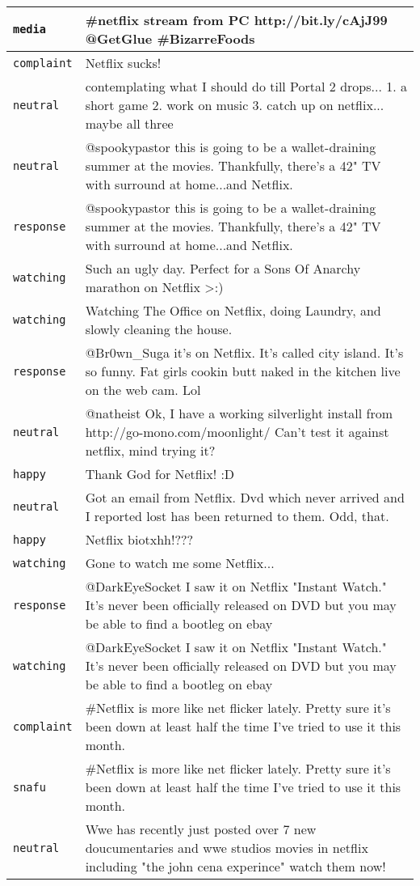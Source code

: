 \begin{center}
\begin{longtable}{|l|p{120mm}|}
         \texttt{media} & \#netflix stream from PC http://bit.ly/cAjJ99 @GetGlue \#BizarreFoods
      \tabularnewline\hline
         \texttt{complaint} & Netflix sucks!
      \tabularnewline\hline
         \texttt{neutral} & contemplating what I should do till Portal 2 drops... 1. a short game 2. work on music 3. catch up on netflix... maybe all three
      \tabularnewline\hline
         \texttt{neutral} & @spookypastor this is going to be a wallet-draining summer at the movies. Thankfully, there's a 42" TV with surround at home...and Netflix.
      \tabularnewline\hline
         \texttt{response} & @spookypastor this is going to be a wallet-draining summer at the movies. Thankfully, there's a 42" TV with surround at home...and Netflix.
      \tabularnewline\hline
         \texttt{watching} & Such an ugly day. Perfect for a Sons Of Anarchy marathon on Netflix >:)
      \tabularnewline\hline
         \texttt{watching} & Watching The Office on Netflix, doing Laundry, and slowly cleaning the house.
      \tabularnewline\hline
         \texttt{response} & @Br0wn\_Suga it's on Netflix. It's called city island. It's so funny. Fat girls cookin butt naked in the kitchen live on the web cam. Lol
      \tabularnewline\hline
         \texttt{neutral} & @natheist Ok, I have a working silverlight install from http://go-mono.com/moonlight/ Can't test it against netflix, mind trying it?
      \tabularnewline\hline
         \texttt{happy} & Thank God for Netflix! :D
      \tabularnewline\hline
         \texttt{neutral} & Got an email from Netflix. Dvd which never arrived and I reported lost has been returned to them. Odd, that.
      \tabularnewline\hline
         \texttt{happy} & Netflix biotxhh!???
      \tabularnewline\hline
         \texttt{watching} & Gone to watch me some Netflix...
      \tabularnewline\hline
         \texttt{response} & @DarkEyeSocket I saw it on Netflix "Instant Watch." It's never been officially released on DVD but you may be able to find a bootleg on ebay
      \tabularnewline\hline
         \texttt{watching} & @DarkEyeSocket I saw it on Netflix "Instant Watch." It's never been officially released on DVD but you may be able to find a bootleg on ebay
      \tabularnewline\hline
         \texttt{complaint} & \#Netflix is more like net flicker lately. Pretty sure it's been down at least half the time I've tried to use it this month.
      \tabularnewline\hline
         \texttt{snafu} & \#Netflix is more like net flicker lately. Pretty sure it's been down at least half the time I've tried to use it this month.
      \tabularnewline\hline
         \texttt{neutral} & Wwe has recently just posted over 7 new doucumentaries and wwe studios movies in netflix including "the john cena experince" watch them now!

\end{longtable}
\end{center}
